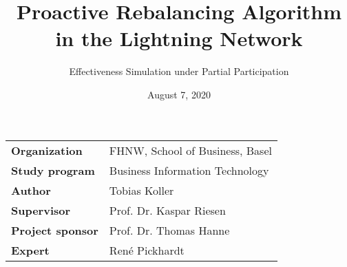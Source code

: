 \documentclass[final]{fhnwreport}       %
\title{Proactive Rebalancing Algorithm in the Lightning Network}                          %
\author{Effectiveness Simulation under Partial Participation}                %
\date{August 7, 2020}                   %
\begin{document}
\maketitle

\vspace*{-1cm}                            %
\vfill
{
\renewcommand\arraystretch{2}
\begin{center}
\begin{tabular}{>{\bf}p{4cm} l}
Organization                  &    FHNW, School of Business, Basel\\
Study program                 &    Business Information Technology\\
Author                        &    Tobias Koller\\
Supervisor                    &    Prof. Dr. Kaspar Riesen\\
Project sponsor               &    Prof. Dr. Thomas Hanne\\
Expert                        &    René Pickhardt
\end{tabular}
\end{center}
}
\clearpage
\end{document}
